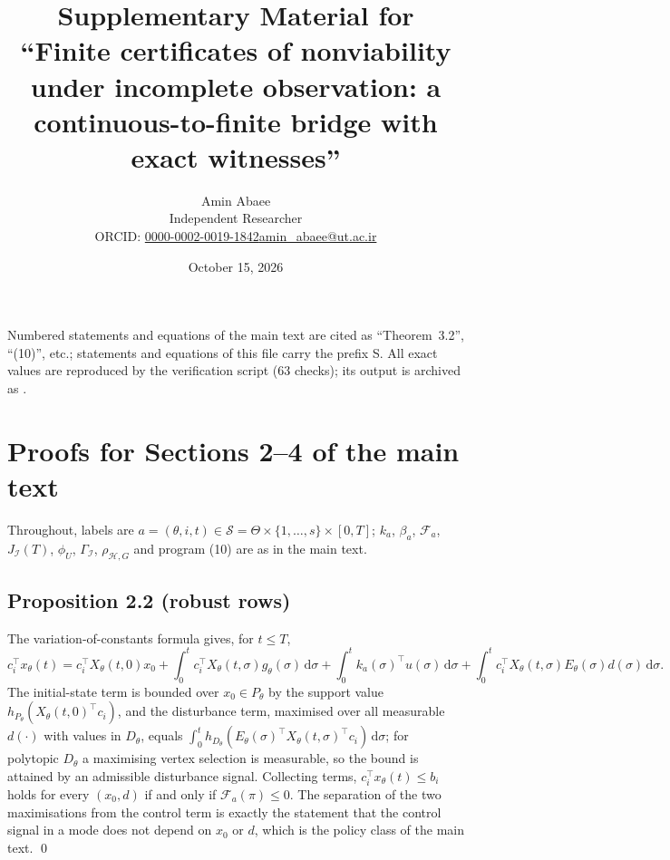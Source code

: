 \documentclass[11pt,a4paper]{article}
\title{\textbf{Supplementary Material for\\ ``Finite certificates of nonviability under incomplete observation: a continuous-to-finite bridge with exact witnesses''}}
\author{Amin Abaee\\[0.3em]{\small Independent Researcher}\\[0.2em]{\small ORCID: \href{https://orcid.org/0000-0002-0019-1842}{0000-0002-0019-1842}\quad \href{mailto:amin_abaee@ut.ac.ir}{amin\_abaee@ut.ac.ir}}}
\date{October 15, 2026}
\theoremstyle{plain}
\theoremstyle{definition}
\theoremstyle{remark}
\newcommand{\calI}{\mathcal{I}}
\newcommand{\calH}{\mathcal{H}}
\newcommand{\calS}{\mathcal{S}}
\newcommand{\calF}{\mathcal{F}}
\newcommand{\J}{J_{\calI}(T)}
\newcommand{\Gam}{\Gamma_{\calI}}
\newcommand{\rhoHG}{\rho_{\calH,G}}
\newcommand{\dd}{\,\mathrm{d}}
\begin{document}
\maketitle

\noindent
Numbered statements and equations of the main text are cited as ``Theorem~3.2'', ``(10)'', etc.; statements and equations of this file carry the prefix S. All exact values are reproduced by the verification script  (63 checks); its output is archived as .

\tableofcontents
\section{Proofs for Sections 2--4 of the main text}\label{S:proofs}

Throughout, labels are $a=(\theta,i,t)\in\calS=\Theta\times\{1,\dots,s\}\times[0,T]$; $k_a$, $\beta_a$, $\calF_a$, $\J$, $\phi_U$, $\Gam$, $\rhoHG$ and program (10) are as in the main text.

\subsection{Proposition 2.2 (robust rows)}
The variation-of-constants formula gives, for $t\le T$,
\[
c_i^\top x_\theta(t)=c_i^\top X_\theta(t,0)x_0+\int_0^tc_i^\top X_\theta(t,\sigma)g_\theta(\sigma)\dd\sigma+\int_0^tk_a(\sigma)^\top u(\sigma)\dd\sigma+\int_0^tc_i^\top X_\theta(t,\sigma)E_\theta(\sigma)d(\sigma)\dd\sigma .
\]
The initial-state term is bounded over $x_0\in P_\theta$ by the support value $h_{P_\theta}(X_\theta(t,0)^\top c_i)$, and the disturbance term, maximised over all measurable $d(\cdot)$ with values in $D_\theta$, equals $\int_0^th_{D_\theta}(E_\theta(\sigma)^\top X_\theta(t,\sigma)^\top c_i)\dd\sigma$; for polytopic $D_\theta$ a maximising vertex selection is measurable, so the bound is attained by an admissible disturbance signal. Collecting terms, $c_i^\top x_\theta(t)\le b_i$ holds for every $(x_0,d)$ if and only if $\calF_a(\pi)\le0$. The separation of the two maximisations from the control term is exactly the statement that the control signal in a mode does not depend on $x_0$ or $d$, which is the policy class of the main text. \qed
\end{document}
